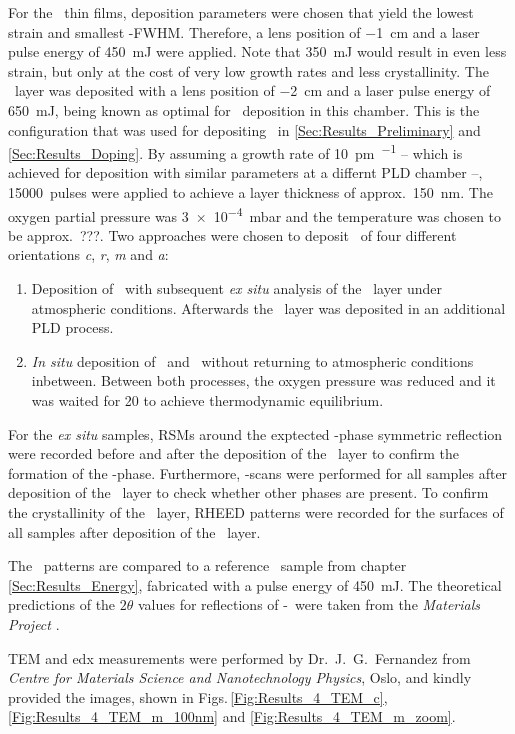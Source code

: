 For the \cro\ thin films, deposition parameters were chosen that yield the lowest strain and smallest \textomega-FWHM.
Therefore, a lens position of \qty{-1}{\cm} and a laser pulse energy of \qty{450}{\milli\joule} were applied.
Note that \qty{350}{\milli\joule} would result in even less strain, but only at the cost of very low growth rates and less crystallinity.
The \gao\ layer was deposited with a lens position of \qty{-2}{\cm} and a laser pulse energy of \qty{650}{\milli\joule}, being known as optimal for \agao\ deposition in this chamber.
This is the configuration that was used for depositing \cro\ in \ref{Sec:Results_Preliminary} and \ref{Sec:Results_Doping}.
By assuming a growth rate of \qty{10}{\pm\per\pulse} -- which is achieved for deposition with similar parameters at a differnt PLD chamber --, \qty{15000}{pulses} were applied to achieve a layer thickness of approx.\ \qty{150}{\nm}.
The oxygen partial pressure was \qty{3e-4}{\milli\bar} and the temperature was chosen to be approx.\ ???.
Two approaches were chosen to deposit \agao\ of four different orientations \textit{c}, \textit{r}, \textit{m} and \textit{a}:
\begin{enumerate}
    \item Deposition of \cro\ with subsequent \textit{ex situ} analysis of the \cro\ layer under atmospheric conditions.
    Afterwards the \gao\ layer was deposited in an additional PLD process.
    \item \textit{In situ} deposition of \cro\ and \gao\ without returning to atmospheric conditions inbetween.
    Between both processes, the oxygen pressure was reduced and it was waited for \qty{20}{\min} to achieve thermodynamic equilibrium.
\end{enumerate}

For the \textit{ex situ} samples, \glspl{RSM} around the exptected \textalpha-phase symmetric reflection were recorded before and after the deposition of the \gao\ layer to confirm the formation of the \textalpha-phase.
Furthermore, \thetaomega-scans were performed for all samples after deposition of the \gao\ layer to check whether other phases are present.
To confirm the crystallinity of the \gao\ layer, \gls{RHEED} patterns were recorded for the surfaces of all samples after deposition of the \gao\ layer.
    

The \thetaomega\ patterns are compared to a reference \cro\ sample from chapter \ref{Sec:Results_Energy}, fabricated with a pulse energy of \qty{450}{\milli\joule}.
The theoretical predictions of the $2\theta$ values for reflections of \textbeta-\gao\ were taken from the \textit{Materials Project}
    \cite[mp-886]{MaterialsProject}.

\gls{TEM} and \gls{edx} measurements were performed by Dr.\ J.\ G.\  Fernandez from \textit{Centre for Materials Science and Nanotechnology Physics}, Oslo, and kindly provided the images, shown in Figs.\,\ref{Fig:Results_4_TEM_c}, \ref{Fig:Results_4_TEM_m_100nm} and \ref{Fig:Results_4_TEM_m_zoom}.